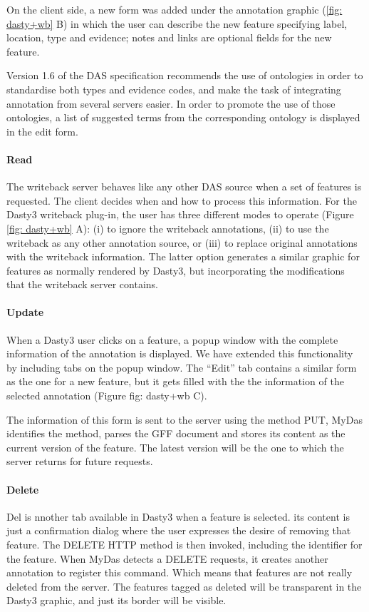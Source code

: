 On the client side, a new form was added under the annotation graphic (\ref{fig: dasty+wb} B) in which the user can describe the new feature specifying label, location, type and evidence; notes and links are optional fields for the new feature. 

Version 1.6 of the DAS specification recommends the use of ontologies in order to standardise both types and evidence codes, and make the task of integrating annotation from several servers easier. In order to promote the use of those ontologies, a list of suggested terms from the corresponding ontology is displayed in the edit form.
  
\paragraph{Read}
The writeback server behaves like any other DAS source when a set of features is requested. The client decides when and how to process this information. For the Dasty3 writeback plug-in, the user has three different modes to operate (Figure \ref{fig: dasty+wb} A): (i) to ignore the writeback annotations, (ii) to use the writeback as any other annotation source, or (iii) to replace original annotations with the writeback information. The latter option generates a similar graphic for features as normally rendered by Dasty3, but incorporating the modifications that the writeback server contains. 

\paragraph{Update}
When a Dasty3 user clicks on a feature, a popup window with the complete information of the annotation is displayed. We have extended this functionality by including tabs on the popup window. The ``Edit'' tab contains a similar form as the one for a new feature, but it gets filled with the the information of the selected annotation (Figure {fig: dasty+wb} C). 

The information of this form is sent to the server using the method PUT, MyDas identifies the method, parses the GFF document and stores its content as the current version of the feature. The latest version will be the one to which the server returns for future requests.

\paragraph{Delete}
Del is nnother tab available in Dasty3 when a feature is selected. its content is just a confirmation dialog where the user expresses the desire of removing that feature. The DELETE HTTP method is then invoked, including the identifier for the feature. When MyDas detects a DELETE requests, it creates another annotation to register this command.  Which means that features are not really deleted from the server. The features tagged as deleted will be transparent in the Dasty3 graphic, and just its border will be visible.


